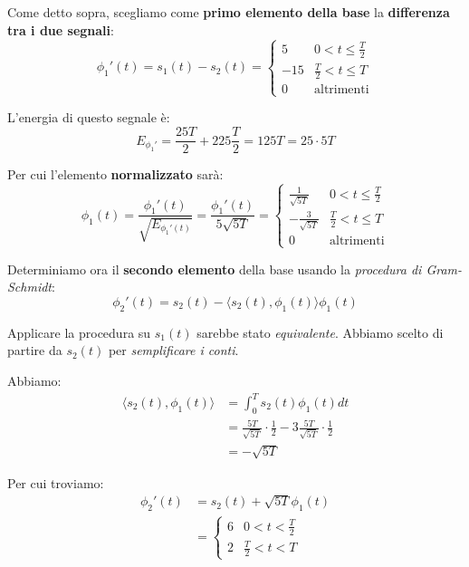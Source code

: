 Come detto sopra, scegliamo come \textbf{primo elemento della base} la 
\textbf{differenza tra i due segnali}:
\[
    \phi_{1}'(t) = s_{1}(t) - s_{2}(t) = \begin{cases}
        5 & 0 < t \le \frac{T}{2} \\ 
        -15 & \frac{T}{2} < t \le T \\ 
        0 & \text{altrimenti}
    \end{cases}
\]

L'energia di questo segnale è:
\[
    E_{\phi_{1}'} = \frac{25T}{2} + 225\frac{T}{2} = 125T = 25\cdot 5T
\]

Per cui l'elemento \textbf{normalizzato} sarà:
\[
    \phi_{1}(t) = \frac{\phi_{1}'(t)}{\sqrt{E_{\phi_{1}'(t)}}} 
    = \frac{\phi_{1}'(t)}{5\sqrt{5T}} = \begin{cases}
        \frac{1}{\sqrt{5T}} & 0 < t \le \frac{T}{2} \\ 
        -\frac{3}{\sqrt{5T}} & \frac{T}{2} < t \le T \\ 
        0 & \text{altrimenti}
    \end{cases}
\]

Determiniamo ora il \textbf{secondo elemento} della base usando la
\textit{procedura di Gram-Schmidt}:
\[
    \phi_{2}'(t) = s_{2}(t) - \langle s_{2}(t) , \phi_{1}(t) \rangle \phi_{1}(t)
\]


\begin{remark}
    Applicare la procedura su $s_{1}(t)$ sarebbe stato \textit{equivalente}.
    Abbiamo scelto di partire da $s_{2}(t)$ per \textit{semplificare i conti}.
\end{remark}

Abbiamo:
\[
    \begin{aligned}
        \langle s_{2}(t) , \phi_{1}(t) \rangle &= \int_{0}^{T} s_{2}(t) \phi_{1}(t) dt \\
            &= \frac{5T}{\sqrt{5T}}\cdot \frac{1}{2} -3 \frac{5T}{\sqrt{5T}}\cdot \frac{1}{2} \\ 
            &= -\sqrt{5T} 
    \end{aligned}
\]

Per cui troviamo:
\[
    \begin{aligned}
        \phi_{2}'(t) &= s_{2}(t) + \sqrt{5T}\phi_{1}(t) \\ 
            &= \begin{cases}
                6 & 0 < t < \frac{T}{2} \\ 
                2 & \frac{T}{2} < t < T
            \end{cases}
    \end{aligned}
\]

